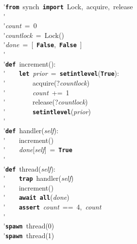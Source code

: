\'\>\texttt{\textbf{from}}~synch~\texttt{\textbf{import}}~Lock,~acquire,~release\\

\'\>\\

\'\>\textit{count}~=~0\\

\'\>\textit{countlock}~=~Lock()\\

\'\>\textit{done}~=~[~\texttt{\textbf{False}},~\texttt{\textbf{False}}~]\\

\'\>\\

\'\>\texttt{\textbf{def}}~increment():\\

\'\>~~~~\texttt{\textbf{let}}~\textit{prior}~=~\texttt{\textbf{setintlevel}}(\texttt{\textbf{True}}):\\

\'\>~~~~~~~~acquire(?\textit{countlock})\\

\'\>~~~~~~~~\textit{count}~+=~1\\

\'\>~~~~~~~~release(?\textit{countlock})\\

\'\>~~~~~~~~\texttt{\textbf{setintlevel}}(\textit{prior})\\

\'\>\\

\'\>\texttt{\textbf{def}}~handler(\textit{self}):\\

\'\>~~~~increment()\\

\'\>~~~~\textit{done}[\textit{self}]~=~\texttt{\textbf{True}}\\

\'\>\\

\'\>\texttt{\textbf{def}}~thread(\textit{self}):\\

\'\>~~~~\texttt{\textbf{trap}}~handler(\textit{self})\\

\'\>~~~~increment()\\

\'\>~~~~\texttt{\textbf{await}}~\texttt{\textbf{all}}(\textit{done})\\

\'\>~~~~\texttt{\textbf{assert}}~\textit{count}~==~4,~\textit{count}\\

\'\>\\

\'\>\texttt{\textbf{spawn}}~thread(0)\\

\'\>\texttt{\textbf{spawn}}~thread(1)